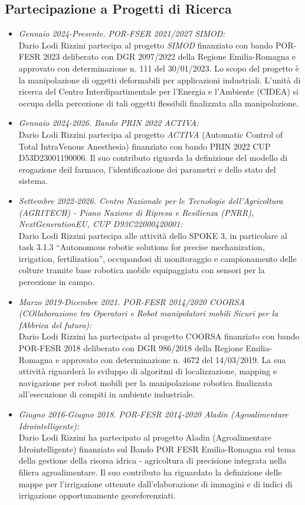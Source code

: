 \documentclass[11pt]{article}
\newcommand{\ITEMDATE}[1]{\item \textit{#1:}\\}
\begin{document}
\begin{itemize}
\section*{Partecipazione a Progetti di Ricerca}

\begin{itemize}

\ITEMDATE{Gennaio 2024-Presente. POR-FSER 2021/2027 SIMOD}
Dario Lodi Rizzini partecipa al progetto \emph{SIMOD} finanziato con bando POR-FESR 2023 deliberato con DGR 2097/2022 della Regione Emilia-Romagna e approvato con determinazione n. 111 del 30/01/2023. 
Lo scopo del progetto \`e la manipolazione di oggetti deformabili per applicazioni industriali. 
L'unit\`a di ricerca del Centro Interdipartimentale per l'Energia e l'Ambiente (CIDEA) si occupa della percezione di tali oggetti flessibili finalizzata alla manipolazione. 

\ITEMDATE{Gennaio 2024-2026. Bando PRIN 2022 ACTIVA}
Dario Lodi Rizzini partecipa al progetto \emph{ACTIVA} (Automatic Control of Total IntraVenous Anesthesia) finanziato con bando PRIN 2022 CUP D53D23001190006. 
Il suo contributo riguarda la definizione del modello di erogazione deil farmaco, l'identificazione dei parametri e dello stato del sistema.  

\ITEMDATE{Settembre 2022-2026. Centro Nazionale per le Tecnologie dell’Agricoltura (AGRITECH) - Piano Nazione di Ripresa e Resilienza (PNRR), NextGenerationEU, CUP D93C22000420001}
Dario Lodi Rizzini partecipa alle attività dello SPOKE 3, in particolare al task 3.1.3 ``Autonomous robotic solutions for precise mechanization, irrigation, fertilization'', occupandosi di monitoraggio e campionamento delle colture tramite base robotica mobile equipaggiata con sensori per la percezione in campo. 

\ITEMDATE{Marzo 2019-Dicembre 2021. POR-FESR 2014/2020 COORSA (COllaborazione tra Operatori e Robot manipolatori mobili Sicuri per la fAbbrica del futuro)}
Dario Lodi Rizzini ha partecipato al progetto COORSA finanziato con bando POR-FESR 2018 deliberato con DGR
986/2018 della Regione Emilia-Romagna e approvato con determinazione n. 4672 del 14/03/2019.
La sua attivit\`a riguarder\`a lo sviluppo di algoritmi di localizzazione, mapping e navigazione per robot mobili 
per la manipolazione robotica finalizzata all'esecuzione di compiti in ambiente industriale. 

\ITEMDATE{Giugno 2016-Giugno 2018. POR-FESR 2014-2020 Aladin (Agroalimentare Idrointelligente)}
Dario Lodi Rizzini ha partecipato al progetto Aladin (Agroalimentare Idrointelligente) 
finanziato sul Bando POR FESR Emilia-Romagna sul tema della gestione della risorsa idrica - 
agricoltura di precisione integrata nella filiera agroalimentare. 
Il suo contributo ha riguardato la definizione delle mappe per l'irrigazione ottenute dall'elaborazione 
di immagini e di indici di irrigazione opportunamente georeferenziati.


\end{itemize}
\end{itemize}
\end{document}
